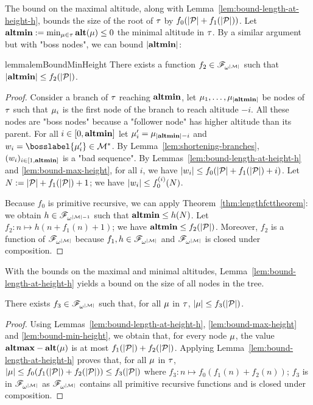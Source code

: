 The bound on the maximal altitude, along with Lemma~\ref{lem:bound-length-at-height-h}, bounds the size of the root of $\tau$ by $f_0(|\mathcal{P}| + f_1(|\mathcal{P}|))$. Let $\mathbf{altmin} := \min_{\mu \in \tau} \mathbf{alt}(\mu) \leq 0$ the minimal altitude in $\tau$. By a similar argument but with "boss nodes", we can bound $|\mathbf{altmin}|$:


\begin{restatable}{lemma}{lemBoundMinHeight}
	\label{lem:bound-min-height}
	There exists a function $f_2 \in \mathscr{F}_{\omega^{|\mathcal{M}|}}$ such that $|\mathbf{altmin}| \leq f_2(|\mathcal{P}|)$.
\end{restatable}

\begin{proof}
	Consider a branch of $\tau$ reaching $\mathbf{altmin}$, let $\mu_1, \ldots, \mu_{|\mathbf{altmin}|}$ be nodes of $\tau$ such that $\mu_i$ is the first node of the branch to reach altitude $-i$. All these nodes are "boss nodes" because a "follower node" has higher altitude than its parent. 
	For all $i \in [0,\mathbf{altmin}]$ let $\mu'_i = \mu_{|\mathbf{altmin}|-i}$ and $w_i = \bosslabel{\node'_{i}} \in \messages^*$.
	By Lemma~\ref{lem:shortening-branches}, $(w_i)_{i \in [1,\mathbf{altmin}]}$ is a "bad sequence".
	By Lemmas~\ref{lem:bound-length-at-height-h} and \ref{lem:bound-max-height}, for all $i$, we have $|w_i| \leq f_0(|\mathcal{P}|+f_1(|\mathcal{P}|) +i)$. Let $N := |\mathcal{P}|+f_1(|\mathcal{P}|)+1$; we have $|w_i| \leq f_0^{(i)}(N)$.  
	
	Because $f_0$ is primitive recursive, we can apply Theorem~\ref{thm:lengthfcttheorem}: we obtain $h \in \mathscr{F}_{\omega^{|\mathcal{M}|-1}}$ such that $\mathbf{altmin} \leq h(N)$. Let $f_2: n \mapsto h(n+ f_1(n) + 1)$; we have $\mathbf{altmin} \leq f_2(|\mathcal{P}|)$. Moreover, $f_2$ is a function of $\mathscr{F}_{\omega^{|\mathcal{M}|}}$ because $f_1, h \in \mathscr{F}_{\omega^{|\mathcal{M}|}}$ and $\mathscr{F}_{\omega^{|\mathcal{M}|}}$ is closed under composition.
\end{proof}

With the bounds on the maximal and minimal altitudes, Lemma~\ref{lem:bound-length-at-height-h} yields a bound on the size of all nodes in the tree.


\begin{lemma}
	\label{lem:bound-node-size}
	There exists $f_3 \in \mathscr{F}_{\omega^{|\mathcal{M}|}}$ such that, for all $\mu$ in $\tau$, $|\mu| \leq f_3(|\mathcal{P}|)$. 
\end{lemma}
\begin{proof}
	Using Lemmas~\ref{lem:bound-length-at-height-h}, \ref{lem:bound-max-height} and \ref{lem:bound-min-height}, we obtain that, for every node $\mu$, the value $\mathbf{altmax} - \mathbf{alt}(\mu)$ is at most $f_1(|\mathcal{P}|) + f_2(|\mathcal{P}|)$. Applying Lemma~\ref{lem:bound-length-at-height-h} proves that, for all $\mu$ in $\tau$, $|\mu| \leq f_0(f_1(|\mathcal{P}|) + f_2(|\mathcal{P}|)) \leq f_3(|\mathcal{P}|)$ where $f_3: n \mapsto f_0(f_1(n) + f_2(n))$; $f_3$ is in $\mathscr{F}_{\omega^{|\mathcal{M}|}}$ as $\mathscr{F}_{\omega^{|\mathcal{M}|}}$ contains all primitive recursive functions and is closed under composition. 
\end{proof}

